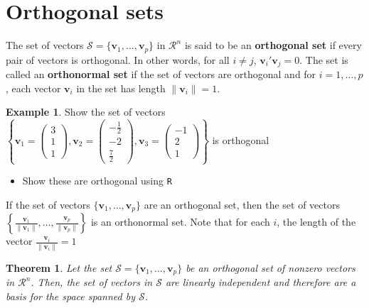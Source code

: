 \documentclass[
]{book}
\providecommand{\tightlist}{%
  \setlength{\itemsep}{0pt}\setlength{\parskip}{0pt}}
\newtheorem{theorem}{Theorem}[chapter]
\theoremstyle{definition}
\theoremstyle{definition}
\newtheorem{example}{Example}[chapter]
\theoremstyle{definition}
\theoremstyle{definition}
\theoremstyle{remark}
\begin{document}
\hypertarget{orthogonal-sets}{%
\section{Orthogonal sets}\label{orthogonal-sets}}

The set of vectors \(\mathcal{S} = \{ \mathbf{v}_1, \ldots, \mathbf{v}_p \}\) in \(\mathcal{R}^n\) is said to be an \textbf{orthogonal set} if every pair of vectors is orthogonal. In other words, for all \(i \neq j\), \(\mathbf{v}_i' \mathbf{v}_j = 0\). The set is called an \textbf{orthonormal set} if the set of vectors are orthogonal and for \(i = 1, \ldots, p\), each vector \(\mathbf{v}_i\) in the set has length \(\| \mathbf{v}_i \| = 1\).

\begin{example}

Show the set of vectors \(\left\{ \mathbf{v}_1 = \begin{pmatrix} 3 \\ 1 \\ 1 \end{pmatrix}, \mathbf{v}_2 = \begin{pmatrix} -\frac{1}{2} \\ -2 \\ \frac{7}{2} \end{pmatrix}, \mathbf{v}_3 = \begin{pmatrix} -1 \\ 2 \\ 1 \end{pmatrix} \right\}\) is orthogonal

\begin{itemize}
\tightlist
\item
  Show these are orthogonal using \texttt{R}
\end{itemize}

\end{example}

If the set of vectors \(\{ \mathbf{v}_1, \ldots, \mathbf{v}_p \}\) are an orthogonal set, then the set of vectors \(\left\{ \frac{\mathbf{v}_1}{\|\mathbf{v}_1\|}, \ldots, \frac{\mathbf{v}_p}{\|\mathbf{v}_p\|} \right\}\) is an orthonormal set. Note that for each \(i\), the length of the vector \(\frac{\mathbf{v}_i} {\|\mathbf{v}_i \|} = 1\)

\begin{theorem}
Let the set \(\mathcal{S} = \{ \mathbf{v}_1, \ldots, \mathbf{v}_p \}\) be an orthogonal set of nonzero vectors in \(\mathcal{R}^n\). Then, the set of vectors in \(\mathcal{S}\) are linearly independent and therefore are a basis for the space spanned by \(\mathcal{S}\).
\end{theorem}
\end{document}
